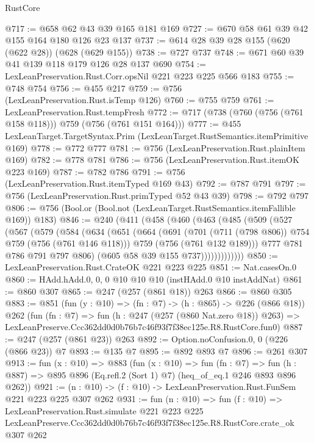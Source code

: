 \begin{lexlean}{RustCore}
\begin{coremodule}
@717 := @658 @62 @43 @39 @165 @181 @169
@727 := @670 @58 @61 @39 @42 @155 @164 @180 @126 @23 @137
@737 := @614 @28 @39 @28 @155 (@620 (@622 @28)) (@628 (@629 @155))
@738 := @727 @737
@748 := @671 @60 @39 @41 @139 @118 @179 @126 @28 @137 @690
@754 := LexLeanPreservation.Rust.Corr.opsNil @221 @223 @225 @566 @183
@755 := @748 @754
@756 := @455 @217
@759 := @756 (LexLeanPreservation.Rust.isTemp @126)
@760 := @755 @759
@761 := LexLeanPreservation.Rust.tempFresh
@772 := @717 (@738 (@760 (@756 (@761 @158 @118))) @759 (@756 (@761 @151 @164)))
@777 := @455 LexLeanTarget.TargetSyntax.Prim (LexLeanTarget.RustSemantics.itemPrimitive @169)
@778 := @772 @777
@781 := @756 (LexLeanPreservation.Rust.plainItem @169)
@782 := @778 @781
@786 := @756 (LexLeanPreservation.Rust.itemOK @223 @169)
@787 := @782 @786
@791 := @756 (LexLeanPreservation.Rust.itemTyped @169 @43)
@792 := @787 @791
@797 := @756 (LexLeanPreservation.Rust.primTyped @52 @43 @39)
@798 := @792 @797
@806 := @756 (Bool.or (Bool.not (LexLeanTarget.RustSemantics.itemFallible @169)) @183)
@846 := @240
    (@411
      (@458
        (@460
          (@463
            (@485
              (@509
                (@527
                  (@567
                    (@579
                      (@584
                        (@634
                          (@651
                            (@664
                              (@691
                                (@701 (@711 (@798 @806)) @754 @759 (@756 (@761 @146 @118)))
                                @759
                                (@756 (@761 @132 @189)))
                              @777
                              @781
                              @786
                              @791
                              @797
                              @806)
                            (@605 @58 @39 @155 @737)))))))))))))
@850 := LexLeanPreservation.Rust.CrateOK @221 @223 @225
@851 := Nat.casesOn.{0}
@860 := HAdd.hAdd.{0, 0, 0} @10 @10 @10 (instHAdd.{0} @10 instAddNat)
@861 := @860 @307
@865 := @247 (@257 (@861 @18)) @263
@866 := @860 @305
@883 := @851
    (fun (y : @10) => (fn : @7) -> (h : @865) -> @226 (@866 @18))
    @262
    (fun (fn : @7) =>
    fun (h : @247 (@257 (@860 Nat.zero @18)) @263) =>
    LexLeanPreserve.Ccc362dd0d0b76b7c46f93f7f38ec125e.R8.RustCore.fun0)
@887 := @247 (@257 (@861 @23)) @263
@892 := Option.noConfusion.{0, 0} (@226 (@866 @23)) @7
@893 := @135 @7
@895 := @892 @893 @7
@896 := @261 @307
@913 := fun (x : @10) =>
  @883
    (fun (x : @10) =>
    fun (fn : @7) =>
    fun (h : @887) => @895 @896 (Eq.refl.{2} (Sort 1) @7) (heq_of_eq.{1} @246 @893 @896 @262))
@921 := (n : @10) -> (f : @10) -> LexLeanPreservation.Rust.FunSem @221 @223 @225 @307 @262
@931 := fun (n : @10) =>
  fun (f : @10) =>
  LexLeanPreservation.Rust.simulate
    @221
    @223
    @225
    LexLeanPreserve.Ccc362dd0d0b76b7c46f93f7f38ec125e.R8.RustCore.crate_ok
    @307
    @262
\end{coremodule}
\end{lexlean}
